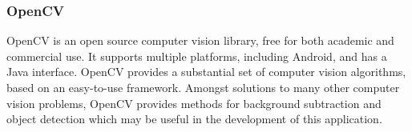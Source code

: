 \subsubsection{OpenCV}

OpenCV\cite{opencv} is an open source computer vision library, free for both academic and commercial use. It supports multiple platforms, including Android, and has a Java interface. OpenCV provides a substantial set of computer vision algorithms, based on an easy-to-use framework. Amongst solutions to many other computer vision problems, OpenCV provides methods for background subtraction and object detection which may be useful in the development of this application.